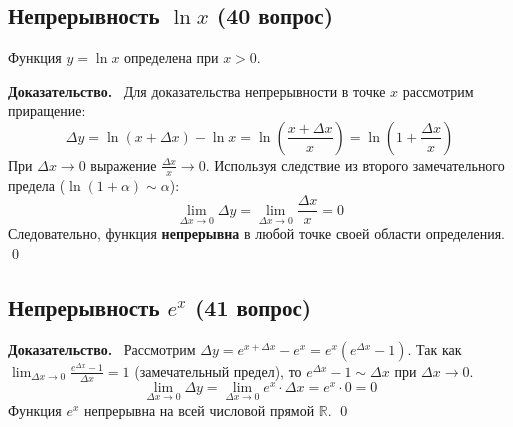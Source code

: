 \documentclass[a4paper,12pt]{article}
\newcommand{\tsubsection}[2]{\subsection[#1]{\texorpdfstring{#2}{#1}}}
\newcommand{\myproof}{\textbf{Доказательство.}\ }
\begin{document}
	\tsubsection{Непрерывность логарифма (40 вопрос)}{Непрерывность $\ln x$ (40 вопрос)}
	
	Функция $y = \ln x$ определена при $x > 0$.
	
	\vspace{0.5cm}
	\myproof
	Для доказательства непрерывности в точке $x$ рассмотрим приращение:
	\[ \Delta y = \ln(x + \Delta x) - \ln x = \ln \left( \frac{x + \Delta x}{x} \right) = \ln \left( 1 + \frac{\Delta x}{x} \right) \]
	При $\Delta x \to 0$ выражение $\frac{\Delta x}{x} \to 0$. Используя следствие из второго замечательного предела ($\ln(1 + \alpha) \sim \alpha$):
	\[ \lim_{\Delta x \to 0} \Delta y = \lim_{\Delta x \to 0} \frac{\Delta x}{x} = 0 \]
	Следовательно, функция \textbf{непрерывна} в любой точке своей области определения. \qed
	
	\begin{center}
	\end{center}
	
	
	
	
	
	\newpage
	\tsubsection{Непрерывность экспоненты (41 вопрос)}{Непрерывность $e^x$ (41 вопрос)}
	
	\myproof
	Рассмотрим $\Delta y = e^{x + \Delta x} - e^x = e^x (e^{\Delta x} - 1)$.
	Так как $\lim_{\Delta x \to 0} \frac{e^{\Delta x} - 1}{\Delta x} = 1$ (замечательный предел), то $e^{\Delta x} - 1 \sim \Delta x$ при $\Delta x \to 0$.
	\[ \lim_{\Delta x \to 0} \Delta y = \lim_{\Delta x \to 0} e^x \cdot \Delta x = e^x \cdot 0 = 0 \]
	Функция $e^x$ непрерывна на всей числовой прямой $\mathbb{R}$. \qed
	
\end{document}
